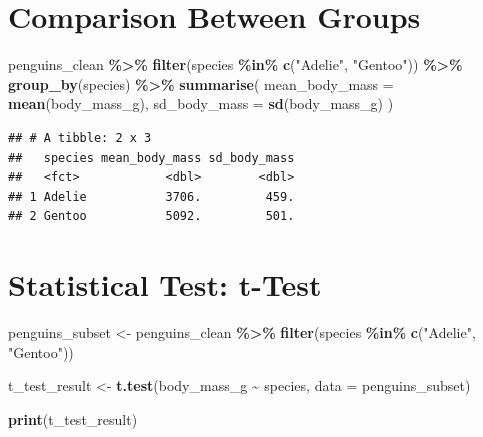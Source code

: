 \documentclass[
]{book}
\newenvironment{Shaded}{\begin{snugshade}}{\end{snugshade}}
\newcommand{\AttributeTok}[1]{\textcolor[rgb]{0.13,0.29,0.53}{#1}}
\newcommand{\FunctionTok}[1]{\textcolor[rgb]{0.13,0.29,0.53}{\textbf{#1}}}
\newcommand{\NormalTok}[1]{#1}
\newcommand{\OtherTok}[1]{\textcolor[rgb]{0.56,0.35,0.01}{#1}}
\newcommand{\SpecialCharTok}[1]{\textcolor[rgb]{0.81,0.36,0.00}{\textbf{#1}}}
\newcommand{\StringTok}[1]{\textcolor[rgb]{0.31,0.60,0.02}{#1}}
\begin{document}
\hypertarget{comparison-between-groups}{%
\section{Comparison Between Groups}\label{comparison-between-groups}}

\begin{Shaded}
\begin{Highlighting}[]
\NormalTok{penguins\_clean }\SpecialCharTok{\%\textgreater{}\%} 
  \FunctionTok{filter}\NormalTok{(species }\SpecialCharTok{\%in\%} \FunctionTok{c}\NormalTok{(}\StringTok{"Adelie"}\NormalTok{, }\StringTok{"Gentoo"}\NormalTok{)) }\SpecialCharTok{\%\textgreater{}\%}
  \FunctionTok{group\_by}\NormalTok{(species) }\SpecialCharTok{\%\textgreater{}\%}
  \FunctionTok{summarise}\NormalTok{(}
    \AttributeTok{mean\_body\_mass =} \FunctionTok{mean}\NormalTok{(body\_mass\_g),}
    \AttributeTok{sd\_body\_mass =} \FunctionTok{sd}\NormalTok{(body\_mass\_g)}
\NormalTok{  )}
\end{Highlighting}
\end{Shaded}

\begin{verbatim}
## # A tibble: 2 x 3
##   species mean_body_mass sd_body_mass
##   <fct>            <dbl>        <dbl>
## 1 Adelie           3706.         459.
## 2 Gentoo           5092.         501.
\end{verbatim}

\hypertarget{statistical-test-t-test}{%
\section{Statistical Test: t-Test}\label{statistical-test-t-test}}

\begin{Shaded}
\begin{Highlighting}[]
\NormalTok{penguins\_subset }\OtherTok{\textless{}{-}}\NormalTok{ penguins\_clean }\SpecialCharTok{\%\textgreater{}\%}
  \FunctionTok{filter}\NormalTok{(species }\SpecialCharTok{\%in\%} \FunctionTok{c}\NormalTok{(}\StringTok{"Adelie"}\NormalTok{, }\StringTok{"Gentoo"}\NormalTok{))}

\NormalTok{t\_test\_result }\OtherTok{\textless{}{-}} \FunctionTok{t.test}\NormalTok{(body\_mass\_g }\SpecialCharTok{\textasciitilde{}}\NormalTok{ species, }
                        \AttributeTok{data =}\NormalTok{ penguins\_subset)}


\FunctionTok{print}\NormalTok{(t\_test\_result)}
\end{Highlighting}
\end{Shaded}
\end{document}
